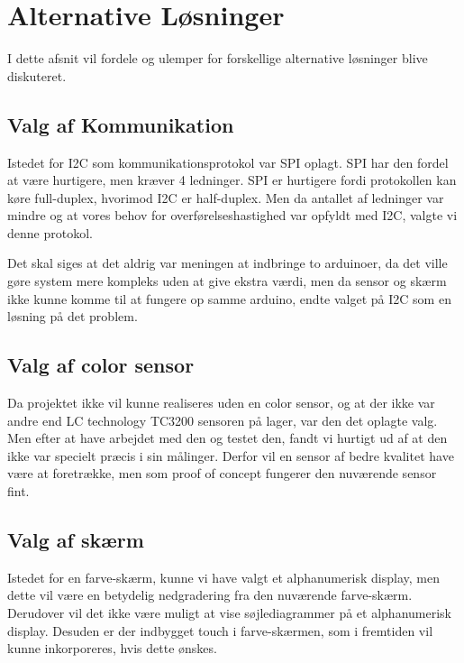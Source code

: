 \graphicspath{{Chapters/Alternative_Loesninger/}}


\section{Alternative Løsninger}
I dette afsnit vil fordele og ulemper for forskellige alternative løsninger blive diskuteret.

\subsection{Valg af Kommunikation}
Istedet for I2C som kommunikationsprotokol var SPI oplagt. SPI har den fordel at være hurtigere, men kræver 4 ledninger. SPI er hurtigere fordi protokollen kan køre full-duplex, hvorimod I2C er half-duplex. Men da antallet af ledninger var mindre og at vores behov for overførelseshastighed var opfyldt med I2C, valgte vi denne protokol.

Det skal siges at det aldrig var meningen at indbringe to arduinoer, da det ville gøre system mere kompleks uden at give ekstra værdi, men da sensor og skærm ikke kunne komme til at fungere op samme arduino, endte valget på I2C som en løsning på det problem.

\subsection{Valg af color sensor}
Da projektet ikke vil kunne realiseres uden en color sensor, og at der ikke var andre end LC technology TC3200 sensoren på lager, var den det oplagte valg. Men efter at have arbejdet med den og testet den, fandt vi hurtigt ud af at den ikke var specielt præcis i sin målinger. Derfor vil en sensor af bedre kvalitet have være at foretrække, men som proof of concept fungerer den nuværende sensor fint. 

\subsection{Valg af skærm}
Istedet for en farve-skærm, kunne vi have valgt et alphanumerisk display, men dette vil være en betydelig nedgradering fra den nuværende farve-skærm. Derudover vil det ikke være muligt at vise søjlediagrammer på et alphanumerisk display. Desuden er der indbygget touch i farve-skærmen, som i fremtiden vil kunne inkorporeres, hvis dette ønskes.